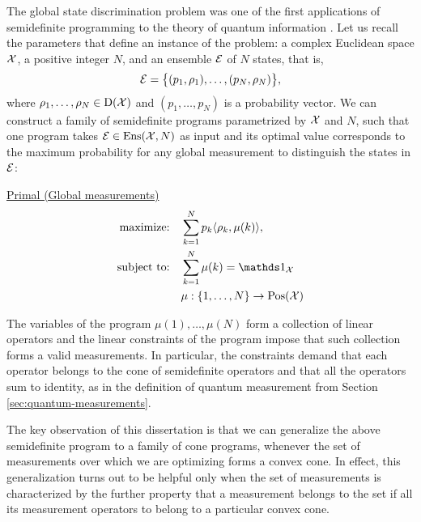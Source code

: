 The global state discrimination problem was one of the 
first applications of semidefinite programming to the theory of quantum 
information \cite{Eldar03a}.
Let us recall the parameters that define an instance of the problem: 
a complex Euclidean space $\mathcal{X}$, a positive integer $N$, and an 
ensemble $\mathcal{E}$ of $N$ states, that is,
\begin{equation}
\label{eq:ensemble}
    \mathcal{E} = \big\{ (p_{1}, \rho_{1}), \ldots, (p_{N}, \rho_{N}) \big\},
\end{equation}
where $\rho_{1}, \ldots, \rho_{N} \in \mathrm{D}(\mathcal{X})$ and $(p_{1}, \ldots, p_{N})$ is
a probability vector.
We can construct a family of semidefinite programs parametrized by $\mathcal{X}$
and $N$, such that one program takes $\mathcal{E} \in \mathrm{Ens}(\mathcal{X}, N)$ as input and 
its optimal value corresponds to the maximum probability for any global 
measurement to distinguish the states in $\mathcal{E}$:
\begin{center}
\underline{Primal (Global measurements)}
\begin{equation}
  \label{eq:pos-primal-problem}
  \begin{split}
    \text{maximize:} \quad & 
    \sum_{k=1}^{N} p_{k}\ip{\rho_{k}}{\mu(k)},\\
    \text{subject to:} \quad & \sum_{k=1}^{N} \mu(k) = \I_{\X}\\
      & \mu : \{1,\ldots, N\}\rightarrow \Pos(\X)
  \end{split}
\end{equation}
\end{center}

The variables of the program $\mu(1), \ldots, \mu(N)$ 
form a collection of linear operators and the linear constraints of the program 
impose that such collection forms a valid measurements. 
In particular, the constraints demand that each operator belongs to the cone of 
semidefinite operators and that all the operators sum to identity, as in the
definition of quantum measurement from Section \ref{sec:quantum-measurements}.

The key observation of this dissertation is that we can generalize the
above semidefinite program to a family of cone programs, whenever
the set of measurements over which we are optimizing forms a convex cone.
In effect, this generalization turns out to be helpful only when the set of
measurements is characterized by the further property that a measurement 
belongs to the set if all its measurement operators to belong to a particular 
convex cone.

